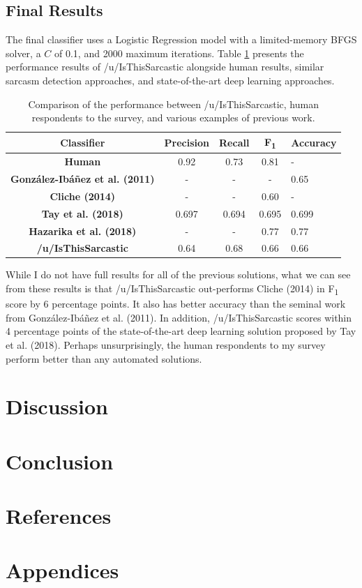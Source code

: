 \documentclass[a4paper,12pt]{article}
\begin{document}
\subsection{Final Results}
The final classifier uses a Logistic Regression model with a limited-memory BFGS solver, a $C$ of 0.1, and 2000 maximum iterations. Table \ref{tab:cmd3} presents the performance results of /u/IsThisSarcastic alongside human results, similar sarcasm detection approaches, and state-of-the-art deep learning approaches.

\begin{table}[h!]
\begin{tabular}{|c|c|c|c|l|}
\hline
\textbf{Classifier}                    & \textbf{Precision} & \textbf{Recall} & \textbf{F\textsubscript{1}} & \textbf{Accuracy} \\ \hline
\textbf{Human}                         & 0.92               & 0.73            & 0.81                        & -                 \\ \hline
\textbf{González-Ibáñez et al. (2011)} & -                  & -               & -                           & 0.65              \\ \hline
\textbf{Cliche (2014)}                 & -                  & -               & 0.60                        & -                 \\ \hline
\textbf{Tay et al. (2018)}             & 0.697              & 0.694           & 0.695                       & 0.699             \\ \hline
\textbf{Hazarika et al. (2018)}        & -                  & -               & 0.77                        & 0.77              \\ \hline
\textbf{/u/IsThisSarcastic}            & 0.64               & 0.68            & 0.66                        & 0.66              \\ \hline
\end{tabular}
\caption{Comparison of the performance between /u/IsThisSarcastic, human respondents to the survey, and various examples of previous work.}
\label{tab:cmd3}
\end{table}

While I do not have full results for all of the previous solutions, what we can see from these results is that /u/IsThisSarcastic out-performs Cliche (2014) in F\textsubscript{1} score by 6 percentage points. It also has better accuracy than the seminal work from González-Ibáñez et al. (2011). In addition, /u/IsThisSarcastic scores within 4 percentage points of the state-of-the-art deep learning solution proposed by Tay et al. (2018). Perhaps unsurprisingly, the human respondents to my survey perform better than any automated solutions.

\section{Discussion}

\section{Conclusion}

\section{References}

\newpage
\section{Appendices}
\end{document}
